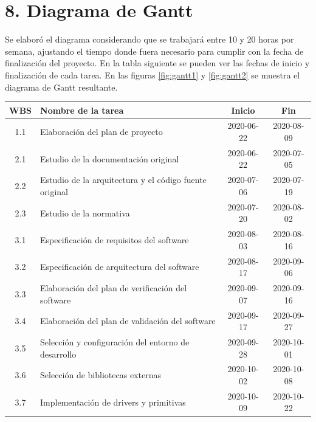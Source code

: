 \documentclass[11pt]{charter}
\begin{document}
\newpage

\section{8. Diagrama de Gantt}
\label{sec:gantt}

Se elaboró el diagrama considerando que se trabajará entre 10 y 20 horas por semana, ajustando el tiempo
donde fuera necesario para cumplir con la fecha de finalización del proyecto. En la tabla siguiente se pueden ver las fechas de
inicio y finalización de cada tarea. En las figuras \ref{fig:gantt1} y \ref{fig:gantt2} se muestra el diagrama de Gantt resultante.

\begin{table}[htpb]
  \centering
  \begin{tabularx}{\linewidth}{@{}|c|X|c|c|@{}}
  \hline
  \rowcolor[HTML]{C0C0C0} 
  WBS  & Nombre de la tarea                                       & Inicio     & Fin        \\ \hline
  1.1  & Elaboración del plan de proyecto                         & 2020-06-22 & 2020-08-09 \\ \hline
  2.1  & Estudio de la documentación original                     & 2020-06-22 & 2020-07-05 \\ \hline
  2.2  & Estudio de la arquitectura y el código fuente original   & 2020-07-06 & 2020-07-19 \\ \hline
  2.3  & Estudio de la normativa                                  & 2020-07-20 & 2020-08-02 \\ \hline
  3.1  & Especificación de requisitos del software                & 2020-08-03 & 2020-08-16 \\ \hline
  3.2  & Especificación de arquitectura del software              & 2020-08-17 & 2020-09-06 \\ \hline
  3.3  & Elaboración del plan de verificación del software        & 2020-09-07 & 2020-09-16 \\ \hline
  3.4  & Elaboración del plan de validación del software          & 2020-09-17 & 2020-09-27 \\ \hline
  3.5  & Selección y configuración del entorno de desarrollo      & 2020-09-28 & 2020-10-01 \\ \hline
  3.6  & Selección de bibliotecas externas                          & 2020-10-02 & 2020-10-08 \\ \hline
  3.7  & Implementación de drivers y primitivas                   & 2020-10-09 & 2020-10-22 \\ \hline

\end{tabularx}
\end{table}
\end{document}

